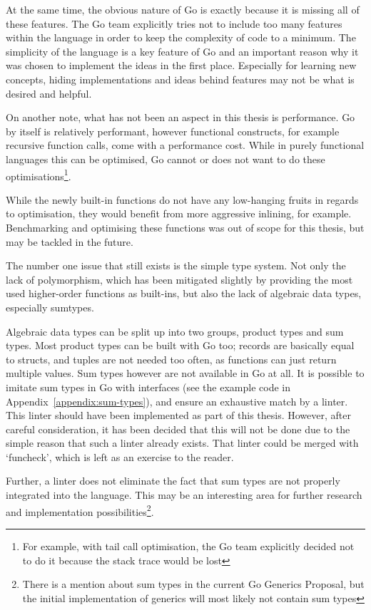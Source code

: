 At the same time, the obvious nature of Go is exactly because it is missing all
of these features. The Go team explicitly tries not to include too many features within
the language in order to keep the complexity of code to a minimum\autocite{go-feature}.
The simplicity of the language is a key feature of Go and an important reason why it was
chosen to implement the ideas in the first place.
Especially for learning new concepts, hiding implementations and ideas behind features
may not be what is desired and helpful.

On another note, what has not been an aspect in this thesis is
performance. Go by itself is relatively performant, however functional constructs, for example
recursive function calls, come with a performance cost. While in purely functional languages
this can be optimised, Go cannot or does not want to do these optimisations\footnote{For example,
with tail call optimisation, the Go team explicitly decided not to do it because the stack trace
would be lost\autocite{go-tco-nope}}.

While the newly built-in functions do not have any low-hanging fruits in regards to optimisation,
they would benefit from more aggressive inlining\autocite{go-compiler-inline}, for example.
Benchmarking and optimising these functions was out of scope for this thesis, but may be tackled
in the future.


The number one issue that still exists is the simple type system. Not only the lack of polymorphism, which
has been mitigated slightly by providing the most used higher-order functions as built-ins, but also the
lack of algebraic data types, especially \gls{sumtypes}.

Algebraic data types can be split up into two groups, product types and sum types.
Most product types can be built with Go too; records are basically
equal to structs, and tuples are not needed too often, as functions can just return multiple values.
Sum types however are not available in Go at all. It is possible to imitate sum types in Go
with interfaces (see the example code in Appendix~\ref{appendix:sum-types}), and ensure an
exhaustive match by a linter. This linter should have been implemented as part of this thesis.
However, after careful consideration, it has been decided that this will not be done
due to the simple reason that such a linter already exists\autocite{sushi-sumtypes}.
That linter could be merged with `funcheck', which is left as an exercise to the reader.

Further, a linter does not eliminate the fact that sum types are not properly integrated
into the language.
This may be an interesting area for further
research and implementation possibilities\footnote{There is a mention about sum types in the current
Go Generics Proposal\autocite{go-generics-proposal}, but the initial implementation of generics will
most likely not contain sum types}.
